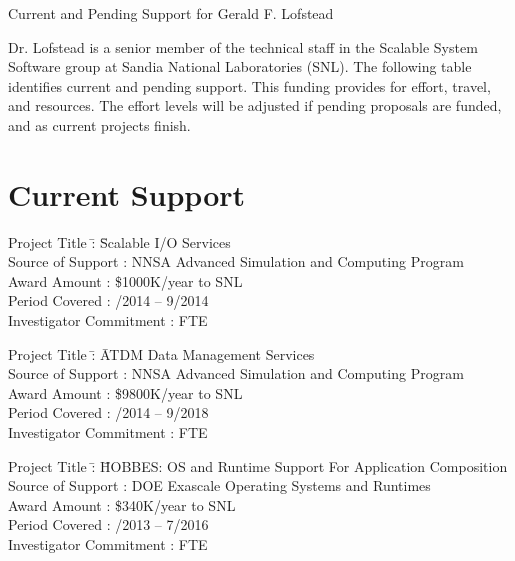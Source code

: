 \documentclass[10pt]{article}
\begin{document}
\begin{center}
{\Large Current and Pending Support for Gerald F. Lofstead}
\end{center}


Dr. Lofstead is a senior member of the technical staff in the Scalable
System Software group at Sandia National Laboratories (SNL). The following
table identifies current and pending support. This funding provides for effort,
travel, and resources. The effort levels will be adjusted if pending proposals
are funded, and as current projects finish.


\section*{Current Support}

\begin{tabbing}
Project Title \hspace{5.5em}\=: \= Scalable I/O Services\\
Source of Support           \>: \> NNSA Advanced Simulation and Computing Program\\
Award Amount                \>: \> \$1000K/year to SNL\\
Period Covered              \>: /2014 -- 9/2014\\
Investigator Commitment     \>:  FTE
\end{tabbing}

\begin{tabbing}
Project Title \hspace{5.5em}\=: \= ATDM Data Management Services\\
Source of Support           \>: \> NNSA Advanced Simulation and Computing Program\\
Award Amount                \>: \> \$9800K/year to SNL\\
Period Covered              \>: /2014 -- 9/2018\\
Investigator Commitment     \>:  FTE
\end{tabbing}

\begin{tabbing}
Project Title \hspace{5.5em}\=: \=  HOBBES: OS and Runtime Support For Application Composition\\
Source of Support           \>:  DOE Exascale Operating Systems and Runtimes\\
Award Amount                \>: \> \$340K/year to SNL\\
Period Covered              \>: /2013 -- 7/2016\\
Investigator Commitment     \>:  FTE
\end{tabbing}
\end{document}
